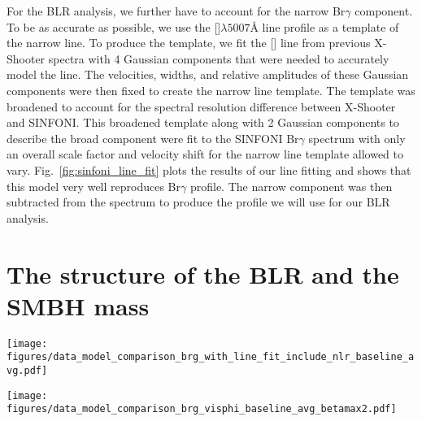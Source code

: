 \documentclass[longauth,]{aa}
\newcommand{\brg}{Br$\gamma$}
\begin{document}
For the BLR analysis, we further have to account for the narrow \brg{} component. To be as accurate as possible, we use the []$\lambda5007$\AA{} line profile as a template of the narrow line. To produce the template, we fit the [] line from previous X-Shooter spectra \citep{Schnorr-Muller:2016aa} with 4 Gaussian components that were needed to accurately model the line. The velocities, widths, and relative amplitudes of these Gaussian components were then fixed to create the narrow line template. The template was broadened to account for the spectral resolution difference between X-Shooter and SINFONI. This broadened template along with 2 Gaussian components to describe the broad component were fit to the SINFONI \brg{} spectrum with only an overall scale factor and velocity shift for the narrow line template allowed to vary. Fig.~\ref{fig:sinfoni_line_fit} plots the results of our line fitting and shows that this model very well reproduces \brg{} profile. The narrow component was then subtracted from the spectrum to produce the profile we will use for our BLR analysis. 

\section{The structure of the BLR and the SMBH mass}

\begin{figure*}
\centering
\texttt{[image: figures/data\_model\_comparison\_brg\_with\_line\_fit\_include\_nlr\_baseline\_avg.pdf]}
\caption{Baseline averaged differential visibility amplitude spectra spanning the \brg{} line (coloured points and grey error bars). The grey profile in each panel plots the same normalised \brg{} spectrum from GRAVITY. The black curves represent the best fit model from our CLR analysis in Sec.~\ref{sec:clr}.}
\label{fig:sc_visamp}
\end{figure*}

\begin{figure*}
\centering
\texttt{[image: figures/data\_model\_comparison\_brg\_visphi\_baseline\_avg\_betamax2.pdf]}
\caption{Baseline averaged differential phase spectra spanning the \brg{} line (coloured points and grey error bars). The grey profile in each panel plots the same normalised \brg{} spectrum from SINFONI with the narrow component removed. The black curves represent the best fit BLR model summed with the continuum phase calculated from our image reconstruction. The model line profile looks noisy due to the continuum phase contribution being calculated based on the observed line profile.}
\label{fig:sc_visphi}
\end{figure*}
\end{document}

